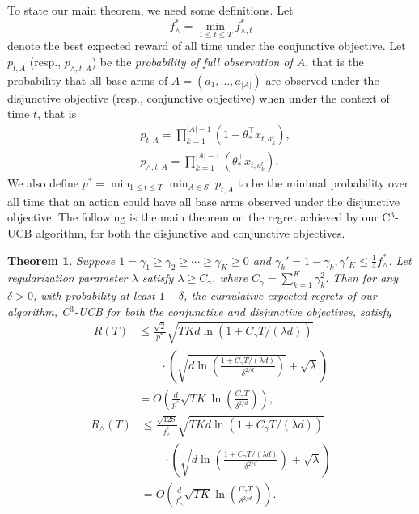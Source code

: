 \documentclass{article}
\newcommand{\cS}{\mathcal{S}}
\newcommand{\abs}[1]{\left| #1 \right|}
\newtheorem{theorem}{Theorem}[section]
\begin{document}
To state our main theorem, we need some definitions. Let
$$
  f_{\wedge}^* = \min_{1 \leq t \leq T} f_{\wedge, t}^{\ast}
$$
denote the best expected reward of all time under the conjunctive objective.
Let $p_{t, A}$ (resp., $p_{\wedge, t, A}$) be the {\em probability of full observation of $A$}, that is the probability that all base arms of $A = (a_1, \ldots, a_{\abs{A}})$ are observed under the disjunctive objective (resp., conjunctive objective) when under the context of time $t$, that is 
\begin{align*}
  &p_{t, A} = \prod_{k=1}^{\abs{A}-1} (1 - \theta_{\ast}^{\top} x_{t, a_k^t}),\\
  &p_{\wedge, t, A} = \prod_{k=1}^{\abs{A}-1} (\theta_{\ast}^{\top} x_{t, a_k^t}).
\end{align*}
We also define $p^* = \min_{1 \leq t \leq T} \min_{A \in \cS} ~ p_{t, A}$ to be the minimal probability over all time that an action could have all base arms observed under the disjunctive objective. The following is the main theorem on the regret achieved by our C$^3$-UCB algorithm, for both the disjunctive and conjunctive objectives.
\begin{theorem} %
  \label{thm:main}
  Suppose $1 = \gamma_1 \geq \gamma_2 \geq \cdots \geq \gamma_{K} \geq 0$ and $\gamma_k' = 1 - \gamma_k, \gamma'_K \leq \frac{1}{4}f_{\wedge}^{\ast}$. 
  Let regularization parameter $\lambda$ satisfy $\lambda \geq C_\gamma$, where $C_\gamma = \sum_{k=1}^{K} \gamma_k^2$. 
  Then for any $\delta > 0$, with probability at least $1 - \delta$, the cumulative expected regrets of our algorithm, C$^3$-UCB for both the conjunctive and disjunctive objectives, satisfy
  \begin{align}
    R(T) &\le \frac{\sqrt{2}}{p^*} \sqrt{TKd\ln(1 + C_\gamma T/(\lambda d))}  \nonumber \\
    &\qquad \cdot \left(\sqrt{d\ln \left( \frac{1 + C_\gamma T/(\lambda d)}{\delta^{2/d}}\right) } + \sqrt{\lambda}\right) \nonumber \\
    &=O\left(\frac{d}{p^*} \sqrt{TK} \ln \left(\frac{C_\gamma T}{\delta^{2/d}}\right) \right),
  \end{align}
  \begin{align}
    R_{\wedge}(T) &\le \frac{\sqrt{128}}{f_{\wedge}^{\ast}} \sqrt{TKd\ln(1 + C_\gamma T/(\lambda d))} \nonumber \\
    &\qquad \cdot \left(\sqrt{d\ln \left( \frac{1 + C_\gamma T/(\lambda d)}{\delta^{2/d}}\right) } + \sqrt{\lambda}\right) \nonumber \\
    &=O\left(\frac{d}{f_{\wedge}^{\ast}}\sqrt{TK} \ln \left(\frac{C_\gamma T}{\delta^{2/d}}\right) \right).
  \end{align}
\end{theorem}
\end{document}
